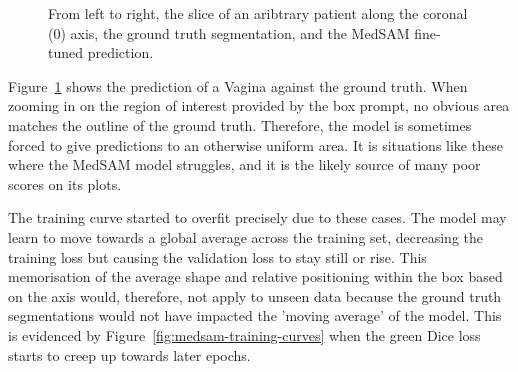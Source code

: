 \documentclass[11pt,twoside]{report}
\begin{document}
\begin{figure}[H]
  \centering

    

  \caption{From left to right, the slice of an aribtrary patient along the coronal (0) axis, the ground truth segmentation, and the MedSAM fine-tuned prediction.}\label{fig:invisible-vagina}
\end{figure}

Figure~\ref{fig:invisible-vagina} shows the prediction of a Vagina against the ground truth. When zooming in on the region of interest provided by the box prompt, no obvious area matches the outline of the ground truth. Therefore, the model is sometimes forced to give predictions to an otherwise uniform area. It is situations like these where the MedSAM model struggles, and it is the likely source of many poor scores on its plots.

The training curve started to overfit precisely due to these cases. The model may learn to move towards a global average across the training set, decreasing the training loss but causing the validation loss to stay still or rise. This memorisation of the average shape and relative positioning within the box based on the axis would, therefore, not apply to unseen data because the ground truth segmentations would not have impacted the 'moving average' of the model. This is evidenced by Figure~\ref{fig:medsam-training-curves} when the green Dice loss starts to creep up towards later epochs.
\end{document}
